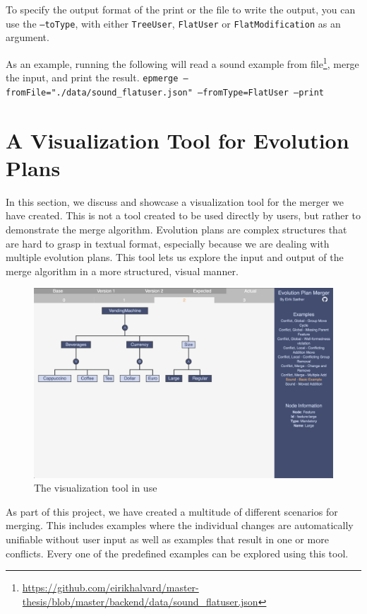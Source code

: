 \documentclass[a4paper,english]{ifimaster}
\begin{document}
To specify the output format of the print or the file to write the output, you can use the \texttt{--toType}, with either \texttt{TreeUser}, \texttt{FlatUser} or \texttt{FlatModification} as an argument.

As an example, running the following will read a sound example from file\footnote{\url{https://github.com/eirikhalvard/master-thesis/blob/master/backend/data/sound\_flatuser.json}}, merge the input, and print the result. \texttt{epmerge --fromFile="./data/sound\_flatuser.json" --fromType=FlatUser --print}

\section{A Visualization Tool for Evolution Plans}%
\label{sec:a_visualization_tool_for_evolution_plans}

In this section, we discuss and showcase a visualization tool for the merger we have created. This is not a tool created to be used directly by users, but rather to demonstrate the merge algorithm. Evolution plans are complex structures that are hard to grasp in textual format, especially because we are dealing with multiple evolution plans. This tool lets us explore the input and output of the merge algorithm in a more structured, visual manner.

\begin{figure}[htpb]
  \centering
  \includegraphics[width=\linewidth]{vending_machine/sound_example.png}
  \caption{The visualization tool in use}%
  \label{fig:visualization_tool_in_use}
\end{figure}

As part of this project, we have created a multitude of different scenarios for merging. This includes examples where the individual changes are automatically unifiable without user input as well as examples that result in one or more conflicts. Every one of the predefined examples can be explored using this tool. 
\end{document}
